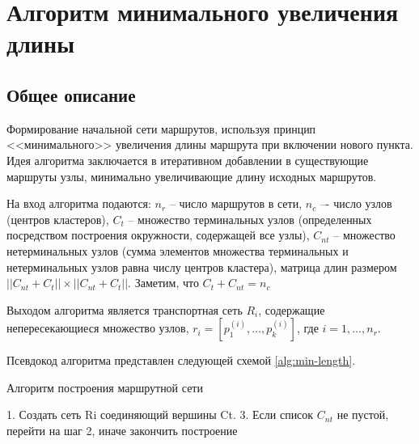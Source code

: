 \section{Алгоритм минимального увеличения длины}\label{sec:second_alg}
\subsection{Общее описание}
Формирование начальной сети маршрутов, используя принцип <<минимального>> увеличения длины маршрута при 
включении нового пункта. Идея алгоритма заключается в итеративном добавлении в существующие маршруты узлы, 
минимально увеличивающие длину исходных маршрутов. 

На вход алгоритма подаются: \( n_r \) -- число маршрутов в сети, \( n_c \) –- число узлов (центров 
кластеров), \( C_t \) – множество терминальных узлов (определенных посредством построения окружности, 
содержащей все узлы), \( C_{nt} \) -- множество нетерминальных узлов (сумма элементов множества терминальных 
и нетерминальных узлов равна числу центров кластера), матрица длин размером 
\( ||{C_{nt}} + {C_{t}}|| \times ||{C_{nt}} + {C_{t}}|| \). Заметим, что \( C_t + C_{nt} = n_c \)

Выходом алгоритма является транспортная сеть \( R_i \), содержащие непересекающиеся множество узлов, 
\( r_{i} = [p_{1}^{(i)}, \dots, p_{k}^{(i)}] \), где \( i = 1, \dots, n_r \). 

Псевдокод алгоритма представлен следующей схемой \ref{alg:min-length}.
\begin{algorithm}[ht!]
    \caption{Алгоритм построения маршрутной сети}
    1. Создать сеть Ri соединяющий вершины Ct. 
    3. Если список \( C_{nt} \) не пустой, перейти на шаг 2, иначе закончить построение\;
    \label{alg:min-length}
\end{algorithm}

